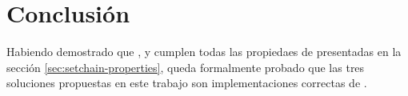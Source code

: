 \section{Conclusión}
Habiendo demostrado que \vanilla, \compresschain y \hashchain cumplen todas las propiedaes
de \setchain presentadas en la sección \ref{sec:setchain-properties}, queda formalmente probado
que las tres soluciones propuestas en este trabajo son implementaciones correctas de \setchain.





